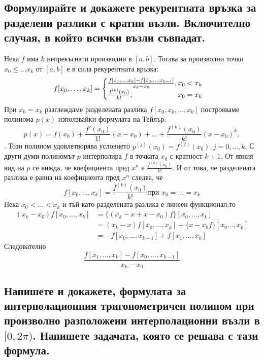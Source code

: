 \documentclass[12pt]{article}
\numberwithin{equation}{subsection}
\numberwithin{theorem}{subsection}
\numberwithin{definition}{subsection}
\numberwithin{corollary}{subsection}
\begin{document}
\subsection{Формулирайте и докажете рекурентната връзка за разделени разлики с кратни възли. Включително случая, в който всички възли съвпадат.}
\theorem
  Нека $f$ има $k$ непрекъснати производни в $[a,b]$. Тогава за произволни точки $x_0\leq\ldots x_k$ от $[a,b]$ е в сила рекурентната връзка:
  \begin{equation}\label{reqHerm}
    f[x_0,\ldots,x_k] = \begin{cases}
                          \frac{f[x_1,\ldots,x_k]-f[x_0,\ldots,x_{k-1}]}{x_k-x_0}, \hfill x_0<x_k\\
                          \frac{f^{(k)}(x_0)}{k!}, \hfill x_0=x_k
                        \end{cases}
  \end{equation}
\proof
  При $x_0=x_k$ разглеждаме разделената разлика $f[x_0,x_0,\ldots,x_0]$ построяваме полинома $p(x)$ използвайки формулата на Тейлър:
  \begin{equation*}
    p(x) = f(x_0)+\frac{f'(x_0)}{1!}(x-x_0)+\ldots+\frac{f^{(k)}(x_0)}{k!}(x-x_0)^k,
  \end{equation*}.
  Този полином удовлетворява условието $p^(j)(x_0)=f^{(j)}(x_0), j=0,\ldots,k.$
  С други думи полиномът $p$ интерполира $f$ в точката $x_0$ с кратност $k+1$. От явния вид на $p$ се вижда, че коефициента пред $x^n$ е $\frac{f^{(k)}(x_0)}{k!}$. И от това, че разделената разлика е равна на коефициента пред $x^n$ следва, че 
  \begin{equation*}
    f[x_0,\ldots,x_k]=\frac{f^{(k)}(x_0)}{k!} \text{при } x_0=\ldots=x_k
  \end{equation*}
  Нека $x_0<\ldots<x_k$ и тъй като разделената разлика е линеен функционал,то
  \begin{align*}
    (x_k-x_0)f[x_0,\ldots,x_k]&=\{(x_k-x+x-x_0)f\}[x_0,\ldots,x_k]\\
    &=(x_k-x)f[x_0,\ldots,x_k]+\{x-x_0f\}[x_0\ldots,x_k]\\
    &=-f[x_0,\ldots,x_{k-1}]+f[x_1,\ldots,x_k]
  \end{align*}
  Следователно
  \begin{equation*}
    \frac{f[x_1,\ldots,x_k]-f[x_0,\ldots,x_{k-1}]}{x_k-x_0}
  \end{equation*}
\subsection{Напишете и докажете, формулата за интерполационния тригонометричен полином при произволно разположени интерполационни възли в $[0, 2\pi)$. Напишете задачата, която се решава с тази формула.}
\end{document}
